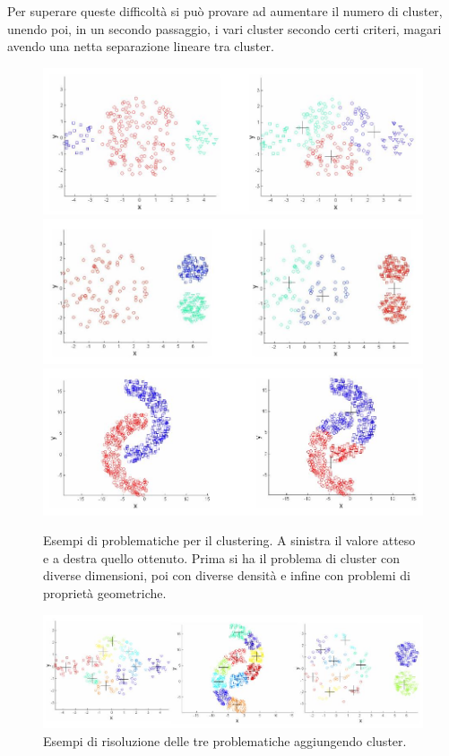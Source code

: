 Per superare queste difficoltà si può provare ad aumentare il numero di cluster,
unendo poi, in un secondo passaggio, i vari cluster secondo certi criteri,
magari avendo una netta separazione lineare tra cluster.\\
\begin{figure}
  \centering
  \includegraphics[scale = 0.4]{img/clu1.jpg}
  \includegraphics[scale = 0.4]{img/clu2.jpg}
  \includegraphics[scale = 0.4]{img/clu3.jpg}
  \caption{Esempi di problematiche per il clustering. A sinistra il valore
    atteso e a destra quello ottenuto. Prima si ha il problema di cluster con
    diverse dimensioni, poi con diverse densità e infine con problemi di
    proprietà geometriche.}
\end{figure}
\begin{figure}
  \centering
  \includegraphics[scale = 0.4]{img/clusol.jpg}
  \caption{Esempi di risoluzione delle tre problematiche aggiungendo cluster.}
\end{figure}
